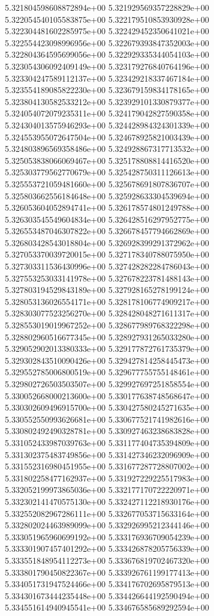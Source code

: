 5.321804598608872894e+00
5.321929569357228829e+00
5.322054540105583875e+00
5.322179510853930928e+00
5.322304481602285975e+00
5.322429452350641021e+00
5.322554423098996956e+00
5.322679393847352003e+00
5.322804364595699056e+00
5.322929335344054103e+00
5.323054306092409149e+00
5.323179276840764196e+00
5.323304247589112137e+00
5.323429218337467184e+00
5.323554189085822230e+00
5.323679159834178165e+00
5.323804130582533212e+00
5.323929101330879377e+00
5.324054072079235311e+00
5.324179042827590358e+00
5.324304013575946293e+00
5.324428984324301339e+00
5.324553955072647504e+00
5.324678925821003439e+00
5.324803896569358486e+00
5.324928867317713532e+00
5.325053838066069467e+00
5.325178808814416520e+00
5.325303779562770679e+00
5.325428750311126613e+00
5.325553721059481660e+00
5.325678691807836707e+00
5.325803662556184648e+00
5.325928633304539694e+00
5.326053604052894741e+00
5.326178574801249788e+00
5.326303545549604834e+00
5.326428516297952775e+00
5.326553487046307822e+00
5.326678457794662869e+00
5.326803428543018804e+00
5.326928399291372962e+00
5.327053370039720015e+00
5.327178340788075950e+00
5.327303311536430996e+00
5.327428282284786043e+00
5.327553253033141978e+00
5.327678223781488143e+00
5.327803194529843189e+00
5.327928165278199124e+00
5.328053136026554171e+00
5.328178106774909217e+00
5.328303077523256270e+00
5.328428048271611317e+00
5.328553019019967252e+00
5.328677989768322298e+00
5.328802960516677345e+00
5.328927931265033280e+00
5.329052902013380333e+00
5.329177872761735379e+00
5.329302843510090426e+00
5.329427814258445473e+00
5.329552785006800519e+00
5.329677755755148461e+00
5.329802726503503507e+00
5.329927697251858554e+00
5.330052668000213600e+00
5.330177638748568647e+00
5.330302609496915700e+00
5.330427580245271635e+00
5.330552550993626681e+00
5.330677521741982616e+00
5.330802492490328781e+00
5.330927463238683828e+00
5.331052433987039763e+00
5.331177404735394809e+00
5.331302375483749856e+00
5.331427346232096909e+00
5.331552316980451955e+00
5.331677287728807002e+00
5.331802258477162937e+00
5.331927229225517983e+00
5.332052199973865036e+00
5.332177170722220971e+00
5.332302141470575130e+00
5.332427112218930176e+00
5.332552082967286111e+00
5.332677053715633164e+00
5.332802024463989099e+00
5.332926995212344146e+00
5.333051965960699192e+00
5.333176936709054239e+00
5.333301907457401292e+00
5.333426878205756339e+00
5.333551848954112273e+00
5.333676819702467320e+00
5.333801790450822367e+00
5.333926761199177413e+00
5.334051731947524466e+00
5.334176702695879513e+00
5.334301673444235448e+00
5.334426644192590494e+00
5.334551614940945541e+00
5.334676585689292594e+00
